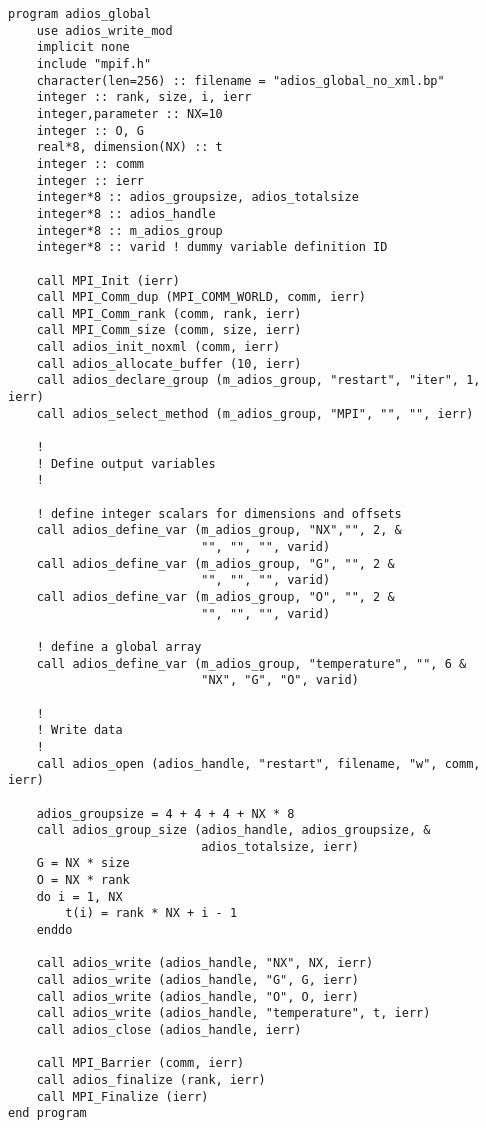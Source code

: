 \begin{lstlisting}[alsolanguage=Fortran,caption={ADIOS no-XML example},label={}]
program adios_global 
    use adios_write_mod
    implicit none
    include "mpif.h"
    character(len=256) :: filename = "adios_global_no_xml.bp" 
    integer :: rank, size, i, ierr
    integer,parameter :: NX=10
    integer :: O, G    
    real*8, dimension(NX) :: t 
    integer :: comm
    integer :: ierr
    integer*8 :: adios_groupsize, adios_totalsize
    integer*8 :: adios_handle
    integer*8 :: m_adios_group
    integer*8 :: varid ! dummy variable definition ID

    call MPI_Init (ierr)
    call MPI_Comm_dup (MPI_COMM_WORLD, comm, ierr)
    call MPI_Comm_rank (comm, rank, ierr) 
    call MPI_Comm_size (comm, size, ierr)
    call adios_init_noxml (comm, ierr)
    call adios_allocate_buffer (10, ierr)
    call adios_declare_group (m_adios_group, "restart", "iter", 1, ierr) 
    call adios_select_method (m_adios_group, "MPI", "", "", ierr)
    
    !
    ! Define output variables
    !

    ! define integer scalars for dimensions and offsets
    call adios_define_var (m_adios_group, "NX","", 2, &
                           "", "", "", varid) 
    call adios_define_var (m_adios_group, "G", "", 2 &
                           "", "", "", varid) 
    call adios_define_var (m_adios_group, "O", "", 2 &
                           "", "", "", varid)
        
    ! define a global array
    call adios_define_var (m_adios_group, "temperature", "", 6 &
                           "NX", "G", "O", varid)

    !
    ! Write data 
    !
    call adios_open (adios_handle, "restart", filename, "w", comm, ierr)
    
    adios_groupsize = 4 + 4 + 4 + NX * 8
    call adios_group_size (adios_handle, adios_groupsize, &
                           adios_totalsize, ierr)
    G = NX * size 
    O = NX * rank 
    do i = 1, NX
        t(i) = rank * NX + i - 1 
    enddo
    
    call adios_write (adios_handle, "NX", NX, ierr)
    call adios_write (adios_handle, "G", G, ierr)
    call adios_write (adios_handle, "O", O, ierr)
    call adios_write (adios_handle, "temperature", t, ierr)
    call adios_close (adios_handle, ierr) 

    call MPI_Barrier (comm, ierr)
    call adios_finalize (rank, ierr)
    call MPI_Finalize (ierr) 
end program
\end{lstlisting}


